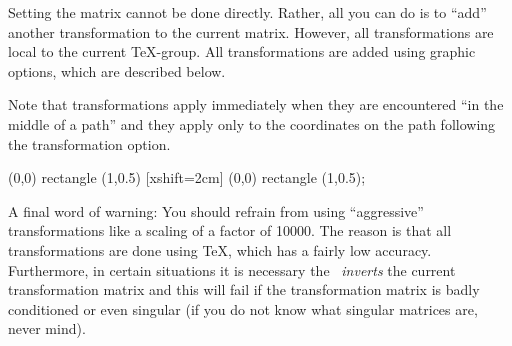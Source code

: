 Setting the matrix cannot be done directly. Rather, all you can do is
to ``add'' another transformation to the current matrix. However, all
transformations are local to the current \TeX-group. All
transformations are added using graphic options, which are described
below.

Note that transformations apply immediately when they are encountered
``in the middle of a path'' and they apply only to the coordinates on
the path following the transformation option.

\begin{codeexample}[]
\tikz \draw (0,0) rectangle (1,0.5) [xshift=2cm] (0,0) rectangle (1,0.5);
\end{codeexample}

A final word of warning: You should refrain from using ``aggressive''
transformations like a scaling of a factor of 10000. The reason is
that all transformations are done using \TeX, which has a fairly low
accuracy. Furthermore, in certain situations it is necessary the
\tikzname\ \emph{inverts} the current transformation matrix and this will
fail if the transformation matrix is badly conditioned or even
singular (if you do not know what singular matrices are, never mind).   

